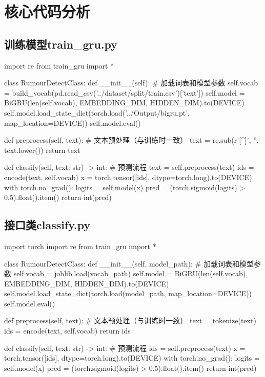\section{核心代码分析}

\subsection{训练模型train\_gru.py}
\begin{codeblock}[language=Python]
import re
from train_gru import *

class RumourDetectClass:
    def __init__(self):
        # 加载词表和模型参数
        self.vocab = build_vocab(pd.read_csv('../dataset/split/train.csv')['text'])
        self.model = BiGRU(len(self.vocab), EMBEDDING_DIM, HIDDEN_DIM).to(DEVICE)
        self.model.load_state_dict(torch.load('../Output/bigru.pt', map_location=DEVICE))
        self.model.eval()

    def preprocess(self, text):
        # 文本预处理（与训练时一致）
        text = re.sub(r'[^\w\s]', '', text.lower())
        return text
    
    def classify(self, text: str) -> int:
        # 预测流程
        text = self.preprocess(text)
        ids = encode(text, self.vocab)
        x = torch.tensor([ids], dtype=torch.long).to(DEVICE)
        with torch.no_grad():
            logits = self.model(x)
            pred = (torch.sigmoid(logits) > 0.5).float().item()
        return int(pred)
\end{codeblock}


\subsection{接口类classify.py}
\begin{codeblock}[language=Python]
import torch
import re
from train_gru import *

class RumourDetectClass:
    def __init__(self, model_path):
        # 加载词表和模型参数
        self.vocab = joblib.load(vocab_path)
        self.model = BiGRU(len(self.vocab), EMBEDDING_DIM, HIDDEN_DIM).to(DEVICE)
        self.model.load_state_dict(torch.load(model_path, map_location=DEVICE))
        self.model.eval()

    def preprocess(self, text):
        # 文本预处理（与训练时一致）
        text = tokenize(text)
        ids = encode(text, self.vocab)
        return ids
    
    def classify(self, text: str) -> int:
        # 预测流程
        ids = self.preprocess(text)
        x = torch.tensor([ids], dtype=torch.long).to(DEVICE)
        with torch.no_grad():
            logits = self.model(x)
            pred = (torch.sigmoid(logits) > 0.5).float().item()
        return int(pred)
\end{codeblock}

